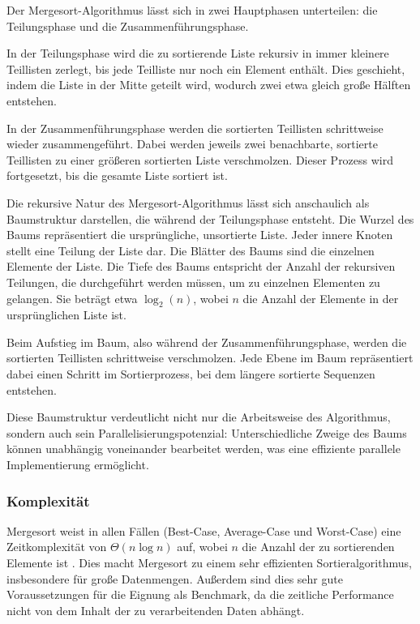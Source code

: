 \documentclass[fontsize=12pt,paper=a4,twoside=semi,parskip=half-,headsepline,headinclude]{scrreprt}
\begin{document}
Der Mergesort-Algorithmus lässt sich in zwei Hauptphasen unterteilen: die Teilungsphase und die Zusammenführungsphase.

In der Teilungsphase wird die zu sortierende Liste rekursiv in immer kleinere Teillisten zerlegt, bis jede Teilliste nur noch ein Element enthält. Dies geschieht, indem die Liste in der Mitte geteilt wird, wodurch zwei etwa gleich große Hälften entstehen.

In der Zusammenführungsphase werden die sortierten Teillisten schrittweise wieder zusammengeführt. Dabei werden jeweils zwei benachbarte, sortierte Teillisten zu einer größeren sortierten Liste verschmolzen. Dieser Prozess wird fortgesetzt, bis die gesamte Liste sortiert ist.

Die rekursive Natur des Mergesort-Algorithmus lässt sich anschaulich als Baumstruktur darstellen, die während der Teilungsphase entsteht. Die Wurzel des Baums repräsentiert die ursprüngliche, unsortierte Liste. Jeder innere Knoten stellt eine Teilung der Liste dar. Die Blätter des Baums sind die einzelnen Elemente der Liste. Die Tiefe des Baums entspricht der Anzahl der rekursiven Teilungen, die durchgeführt werden müssen, um zu einzelnen Elementen zu gelangen. Sie beträgt etwa $\log_2(n)$, wobei $n$ die Anzahl der Elemente in der ursprünglichen Liste ist.

Beim Aufstieg im Baum, also während der Zusammenführungsphase, werden die sortierten Teillisten schrittweise verschmolzen. Jede Ebene im Baum repräsentiert dabei einen Schritt im Sortierprozess, bei dem längere sortierte Sequenzen entstehen.

Diese Baumstruktur verdeutlicht nicht nur die Arbeitsweise des Algorithmus, sondern auch sein Parallelisierungspotenzial: Unterschiedliche Zweige des Baums können unabhängig voneinander bearbeitet werden, was eine effiziente parallele Implementierung ermöglicht.

\subsubsection{Komplexität}

Mergesort weist in allen Fällen (Best-Case, Average-Case und Worst-Case) eine Zeitkomplexität von $\Theta(n \log n)$ auf, wobei $n$ die Anzahl der zu sortierenden Elemente ist \cite{Cormen2022}. Dies macht Mergesort zu einem sehr effizienten Sortieralgorithmus, insbesondere für große Datenmengen. Außerdem sind dies sehr gute Voraussetzungen für die Eignung als Benchmark, da die zeitliche Performance nicht von dem Inhalt der zu verarbeitenden Daten abhängt.
\end{document}
